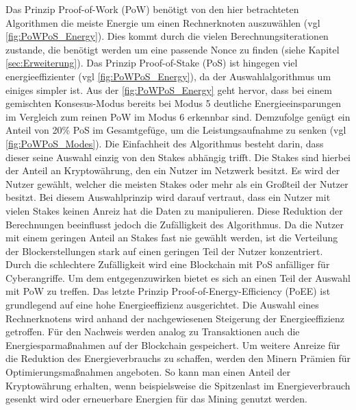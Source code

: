Das Prinzip \glqq Proof-of-Work\grqq{} (PoW) benötigt von den hier betrachteten Algorithmen die meiste 
Energie um einen Rechnerknoten auszuwählen (vgl \autoref{fig:PoWPoS_Energy}). Dies kommt durch die vielen 
Berechnungsiterationen zustande, die benötigt werden um eine passende Nonce zu finden 
(siehe Kapitel \ref{sec:Erweiterung}).
\newline
Das Prinzip \glqq Proof-of-Stake\grqq{} (PoS) ist hingegen viel energieeffizienter 
(vgl \autoref{fig:PoWPoS_Energy}), da der Auswahlalgorithmus um einiges simpler ist.
Aus der \autoref{fig:PoWPoS_Energy} geht hervor, dass bei einem gemischten Konsesus-Modus bereits bei 
Modus 5 deutliche Energieeinsparungen im Vergleich zum reinen PoW im Modus 6 erkennbar sind. Demzufolge genügt ein Anteil von 20\% PoS im 
Gesamtgefüge, um die Leistungsaufnahme zu senken (vgl \autoref{fig:PoWPoS_Modes}).
Die Einfachheit des Algorithmus besteht darin, dass dieser seine Auswahl einzig von den Stakes abhängig
trifft. Die Stakes sind hierbei der Anteil an Kryptowährung, den ein Nutzer im Netzwerk besitzt.
Es wird der Nutzer gewählt, welcher die meisten Stakes oder mehr als ein Gro\ss teil der Nutzer besitzt.
Bei diesem Auswahlprinzip wird darauf vertraut, dass ein Nutzer mit vielen Stakes keinen Anreiz hat die
Daten zu manipulieren.\newline
Diese Reduktion der Berechnungen beeinflusst jedoch die Zufälligkeit des Algorithmus. Da die Nutzer mit 
einem geringen Anteil an Stakes fast nie gewählt werden, ist die Verteilung der Blockerstellungen stark 
auf einen geringen Teil der Nutzer konzentriert. Durch die schlechtere Zufälligkeit wird eine Blockchain 
mit PoS anfälliger für Cyberangriffe. Um dem entgegenzuwirken bietet es sich an einen Teil der Auswahl
mit PoW zu treffen.
\cite[p.280f]{Nair2021Energy}
\newline
Das letzte Prinzip \glqq Proof-of-Energy-Efficiency\grqq{} (PoEE) ist grundlegend auf eine hohe 
Energieeffizienz ausgerichtet. Die Auswahl eines Rechnerknotens wird anhand der nachgewiesenen Steigerung
der Energieeffizienz getroffen. 
Für den Nachweis werden analog zu Transaktionen auch die Energiesparma\ss nahmen auf der Blockchain 
gespeichert. Um weitere Anreize für die Reduktion des Energieverbrauchs zu schaffen, werden den 
Minern Prämien für Optimierungsma\ss nahmen angeboten.
So kann man einen Anteil der Kryptowährung erhalten, wenn beispielsweise die Spitzenlast im 
Energieverbrauch gesenkt wird oder erneuerbare Energien für das Mining genutzt werden. 
\cite[p.~2f]{Athar2024BC_Sustainability}

